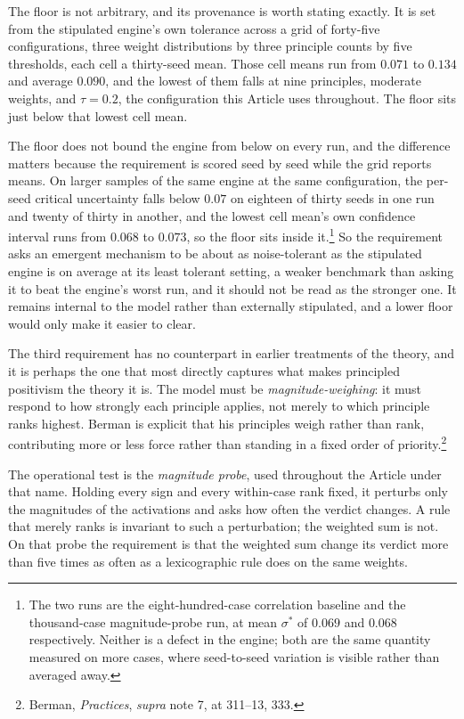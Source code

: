 The floor is not arbitrary, and its provenance is worth stating exactly. It is
set from the stipulated engine's own tolerance across a grid of
forty-five configurations, three weight distributions by three principle
counts by five thresholds, each cell a thirty-seed mean. Those cell means run
from $0.071$ to $0.134$ and average $0.090$, and the lowest of them falls at
nine principles, moderate weights, and $\tau = 0.2$, the configuration
this Article uses throughout. The floor sits just below that
lowest cell mean.

The floor does not bound the engine from below on every run, and
the difference matters because the requirement is scored seed by seed while
the grid reports means. On larger samples of the same engine at the same
configuration, the per-seed critical uncertainty falls below $0.07$ on
eighteen of thirty seeds in one run and twenty of thirty in another, and the
lowest cell mean's own confidence interval runs from $0.068$ to $0.073$, so
the floor sits inside it.\footnote{The two runs are the eight-hundred-case
correlation baseline and the thousand-case magnitude-probe run, at mean
$\sigma^{*}$ of $0.069$ and $0.068$ respectively. Neither is a defect in the
engine; both are the same quantity measured on more cases, where seed-to-seed
variation is visible rather than averaged away.} So the requirement asks an
emergent mechanism to be about as noise-tolerant as the stipulated engine is
on average at its least tolerant setting, a weaker benchmark than
asking it to beat the engine's worst run, and it should not be read as the
stronger one. It remains internal to the model rather than externally
stipulated, and a lower floor would only make it easier to clear.

The third requirement has no counterpart in earlier treatments of the
theory, and it is perhaps the one that most directly captures what makes
principled positivism the theory it is. The model must be \textit{magnitude-weighing}: it must respond to how strongly
each principle applies, not merely to which principle ranks highest. Berman is explicit that his principles weigh rather
than rank, contributing more or less force rather than standing in a fixed
order of priority.\footnote{Berman, \textit{Practices}, \textit{supra} note
7, at 311--13, 333.}

The operational test is the \textit{magnitude probe}, used throughout the
Article under that name. Holding every sign and every within-case rank fixed,
it perturbs only the magnitudes of the activations and asks how often the
verdict changes. A rule that
merely ranks is invariant to such a perturbation; the weighted sum is not.
On that probe the requirement is that the weighted sum change its verdict
more than five times as often as a lexicographic rule does on the same
weights.

